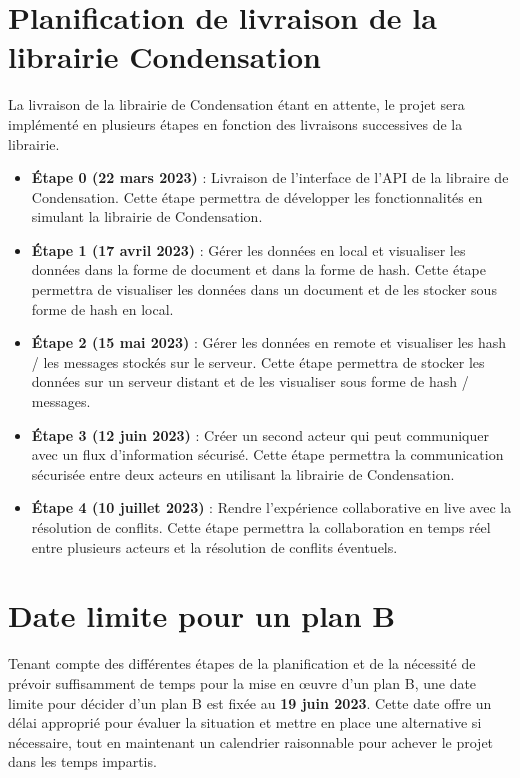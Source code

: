 \section*{Planification de livraison de la librairie Condensation}
La livraison de la librairie de Condensation étant en attente, le projet sera implémenté en plusieurs étapes en fonction des livraisons successives de la librairie.
\begin{itemize}
    \item \textbf{Étape 0 (22 mars 2023)} : Livraison de l'interface de l'API de la libraire de Condensation. Cette étape permettra de développer les fonctionnalités en simulant la librairie de Condensation.
    \item \textbf{Étape 1 (17 avril 2023)} : Gérer les données en local et visualiser les données dans la forme de document et dans la forme de hash. Cette étape permettra de visualiser les données dans un document et de les stocker sous forme de hash en local.
    \item \textbf{Étape 2 (15 mai 2023)} : Gérer les données en remote et visualiser les hash / les messages stockés sur le serveur. Cette étape permettra de stocker les données sur un serveur distant et de les visualiser sous forme de hash / messages.
    \item \textbf{Étape 3 (12 juin 2023)} : Créer un second acteur qui peut communiquer avec un flux d'information sécurisé. Cette étape permettra la communication sécurisée entre deux acteurs en utilisant la librairie de Condensation.
    \item \textbf{Étape 4 (10 juillet 2023)} : Rendre l'expérience collaborative en live avec la résolution de conflits. Cette étape permettra la collaboration en temps réel entre plusieurs acteurs et la résolution de conflits éventuels.
\end{itemize}

\section*{Date limite pour un plan B}
Tenant compte des différentes étapes de la planification et de la nécessité de prévoir suffisamment de temps pour la mise en œuvre d'un plan B, une date limite pour décider d'un plan B est fixée au \textbf{19 juin 2023}. Cette date offre un délai approprié pour évaluer la situation et mettre en place une alternative si nécessaire, tout en maintenant un calendrier raisonnable pour achever le projet dans les temps impartis.